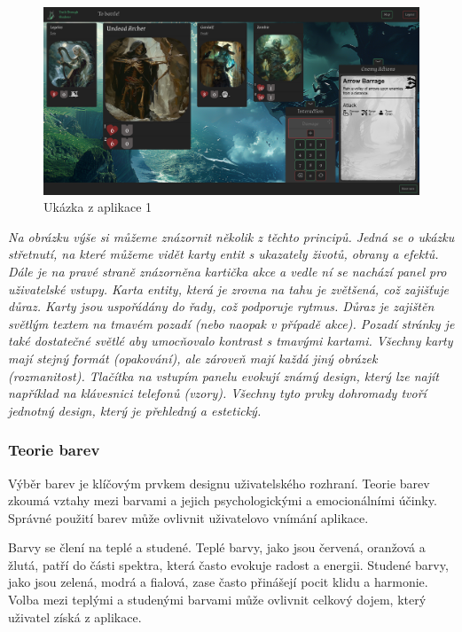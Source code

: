 \begin{figure}[H]
  \centering
  \includegraphics[width=\textwidth]{resources/figures/example1.png}
  \caption{Ukázka z aplikace 1}
  \label{fig:example1}
\end{figure}

\textit{Na obrázku výše si můžeme znázornit několik z těchto principů. Jedná se o ukázku střetnutí, na které můžeme vidět karty entit s ukazately životů, obrany a efektů. Dále je na pravé straně znázorněna kartička akce a vedle ní se nachází panel pro uživatelské vstupy. Karta entity, která je zrovna na tahu je zvětšená, což zajišťuje důraz. Karty jsou uspořádány do řady, což podporuje rytmus. Důraz je zajištěn světlým textem na tmavém pozadí (nebo naopak v případě akce). Pozadí stránky je také dostatečné světlé aby umocňovalo kontrast s tmavými kartami. Všechny karty mají stejný formát (opakování), ale zároveň mají každá jiný obrázek (rozmanitost). Tlačítka na vstupím panelu evokují známý design, který lze najít například na klávesnici telefonů (vzory). Všechny tyto prvky dohromady tvoří jednotný design, který je přehledný a estetický.}

\subsubsection{Teorie barev}
Výběr barev je klíčovým prvkem designu uživatelského rozhraní. Teorie barev zkoumá vztahy mezi barvami a jejich psychologickými a emocionálními účinky. Správné použití barev může ovlivnit uživatelovo vnímání aplikace.

Barvy se člení na teplé a studené. Teplé barvy, jako jsou červená, oranžová a žlutá, patří do části spektra, která často evokuje radost a energii. Studené barvy, jako jsou zelená, modrá a fialová, zase často přinášejí pocit klidu a harmonie. Volba mezi teplými a studenými barvami může ovlivnit celkový dojem, který uživatel získá z aplikace.


